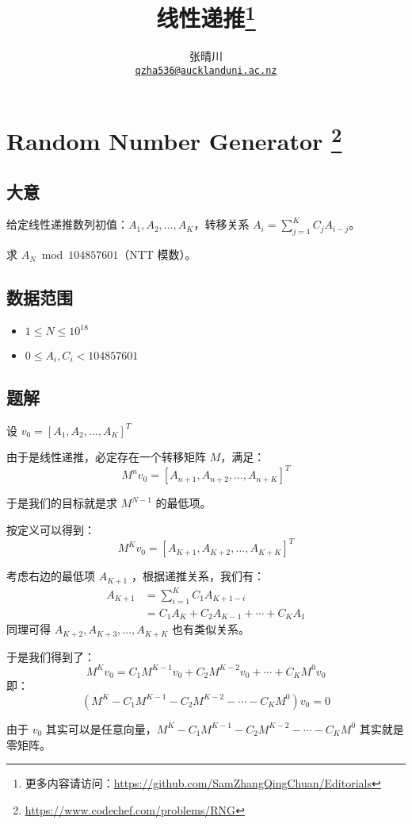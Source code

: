 \documentclass{article}
\title{线性递推\footnote{更多内容请访问：\url{https://github.com/SamZhangQingChuan/Editorials}}}
\author{张晴川\\\href{mailto:qzha536@aucklanduni.ac.nz}{\texttt{qzha536@aucklanduni.ac.nz}}}
\begin{document}
\maketitle

\section*{Random Number Generator \footnote{\url{https://www.codechef.com/problems/RNG}}}
\subsection*{大意}

给定线性递推数列初值：$A_1,A_2,\ldots ,A_K$，转移关系 $A_i = \sum_{j=1}^K C_j A_{i-j}$。

求 $A_N \bmod 104857601$（NTT 模数）。

\subsection*{数据范围}
\begin{itemize}
\item $ 1 \le N \le 10^{18}$
\item $0 \le A_i, C_i < 104857601$
\end{itemize}
\subsection*{题解}
设 $v_0 = [A_1,A_2,\ldots ,A_K]^T$

由于是线性递推，必定存在一个转移矩阵 $M$，满足：
$$
M^n v_0 = [A_{n+1},A_{n+2},\ldots ,A_{n+K}]^T
$$

于是我们的目标就是求 $M^{N-1}$ 的最低项。

按定义可以得到：
$$
M^K v_0 = [A_{K+1},A_{K+2},\ldots ,A_{K+K}]^T
$$

考虑右边的最低项 $A_{K+1}$ ，根据递推关系，我们有：
\begin{align*}
A_{K+1} 
&= \sum_{i=1}^K C_1 A_{K+1-i}\\
&= C_1 A_K + C_2 A_{K-1} +\cdots + C_K A_1
\end{align*}
同理可得 $A_{K+2},A_{K+3},\ldots ,A_{K+K}$ 也有类似关系。

于是我们得到了：
$$
M^K v_0= C_1 M^{K-1}v_0 + C_2 M^{K-2} v_0 + \cdots + C_K M^{0} v_0
$$
即：
$$
(M^K - C_1 M^{K-1}  - C_2 M^{K-2}  - \cdots - C_K M^{0}) v_0 = 0
$$

由于 $v_0$ 其实可以是任意向量，$M^K - C_1 M^{K-1}  - C_2 M^{K-2}  - \cdots - C_K M^{0}$ 其实就是零矩阵。
\end{document}
